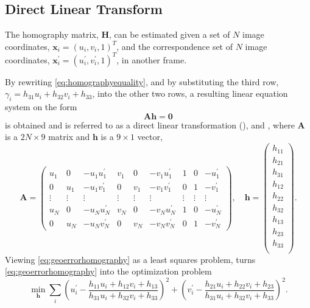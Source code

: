 \subsection{Direct Linear Transform}
The homography matrix, $\bm{H}$, can be estimated given a set of $N$ image coordinates, $\bm{x}_i = (u_i, v_i, 1)^T$, and the correspondence set of $N$ image coordinates, $\bm{x}^\prime_i = (u^\prime_i, v^\prime_i, 1)^T$, in another frame.

By rewriting \eqref{eq:homographyequality}, and by substituting the third row, $\gamma_i = h_{31}u_i + h_{32}v_i + h_{33}$, into the other two rows, a resulting linear equation system on the form
%
\begin{equation}
	\label{eq:geoerrorhomography}
	\bm{A} \bm{h} = \bm{0}
\end{equation}
%
is obtained and is referred to as a direct linear transformation (\abbrDLT), \eg \cite{Hartley:2004} and \cite{Nordberg:2015}, where $\bm{A}$ is a $2 N \times 9$ matrix and $\bm{h}$ is a $9 \times 1$ vector,
%
\begin{equation}
	\bm{A} =
	\begin{pmatrix}
		u_1 & 0 & -u_1 u_1^\prime & v_1 & 0 & - v_1 u_1^\prime & 1 & 0 & -u_1^\prime \\
		0 & u_1 & -u_1 v_1^\prime & 0 & v_1 & - v_1 v_1^\prime & 0 & 1 & -v_1^\prime \\
		\vdots & \vdots & \vdots & \vdots & \vdots & \vdots & \vdots & \vdots & \vdots \\
		u_N & 0 & -u_N u_N^\prime & v_N & 0 & - v_N u_N^\prime & 1 & 0 & -u_N^\prime \\
		0 & u_N & -u_N v_N^\prime & 0 & v_N & - v_N v_N^\prime & 0 & 1 & -v_N^\prime
	\end{pmatrix}
	,
	\quad
	\bm{h} =
	\begin{pmatrix}
		h_{11} \\
		h_{21} \\
		h_{31} \\
		h_{12} \\
		h_{22} \\
		h_{32} \\
		h_{13} \\
		h_{23} \\
		h_{33} \\
	\end{pmatrix}
	.
\end{equation}
%
Viewing \eqref{eq:geoerrorhomography} as a least squares problem, turns \eqref{eq:geoerrorhomography} into the optimization problem
%
\begin{equation}
	\min_{\bm{h}} \sum_i
	\left( u^\prime_i - \frac{h_{11}u_i + h_{12}v_i + h_{13}}{h_{31}u_i + h_{32}v_i + h_{33}} \right)^2 +
	\left( v^\prime_i - \frac{h_{21}u_i + h_{22}v_i + h_{23}}{h_{31}u_i + h_{32}v_i + h_{33}} \right)^2.
\end{equation}

